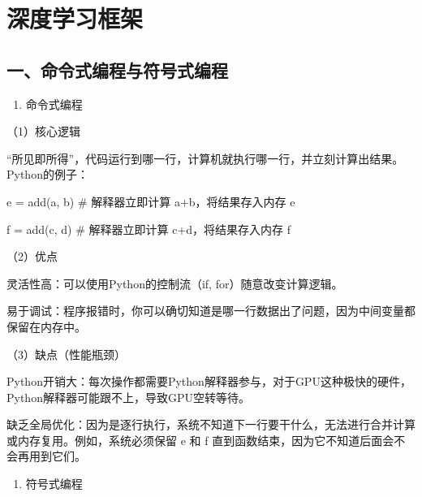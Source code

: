 \setcounter{section}{1}

\hypertarget{ux6df1ux5ea6ux5b66ux4e60ux6846ux67b6}{%
\section{深度学习框架}\label{ux6df1ux5ea6ux5b66ux4e60ux6846ux67b6}}

\hypertarget{ux4e00ux547dux4ee4ux5f0fux7f16ux7a0bux4e0eux7b26ux53f7ux5f0fux7f16ux7a0b}{%
\subsection{一、命令式编程与符号式编程}\label{ux4e00ux547dux4ee4ux5f0fux7f16ux7a0bux4e0eux7b26ux53f7ux5f0fux7f16ux7a0b}}

\begin{enumerate}
\def\labelenumi{\arabic{enumi}.}
\tightlist
\item
  命令式编程
\end{enumerate}

（1）核心逻辑

``所见即所得''，代码运行到哪一行，计算机就执行哪一行，并立刻计算出结果。Python的例子：

e = add(a, b) \# 解释器立即计算 a+b，将结果存入内存 e

f = add(c, d) \# 解释器立即计算 c+d，将结果存入内存 f

（2）优点

灵活性高：可以使用Python的控制流（if, for）随意改变计算逻辑。

易于调试：程序报错时，你可以确切知道是哪一行数据出了问题，因为中间变量都保留在内存中。

（3）缺点（性能瓶颈）

Python开销大：每次操作都需要Python解释器参与，对于GPU这种极快的硬件，Python解释器可能跟不上，导致GPU空转等待。

缺乏全局优化：因为是逐行执行，系统不知道下一行要干什么，无法进行合并计算或内存复用。例如，系统必须保留 e 和 f 直到函数结束，因为它不知道后面会不会再用到它们。

\begin{enumerate}
\def\labelenumi{\arabic{enumi}.}
\setcounter{enumi}{1}
\tightlist
\item
  符号式编程
\end{enumerate}

